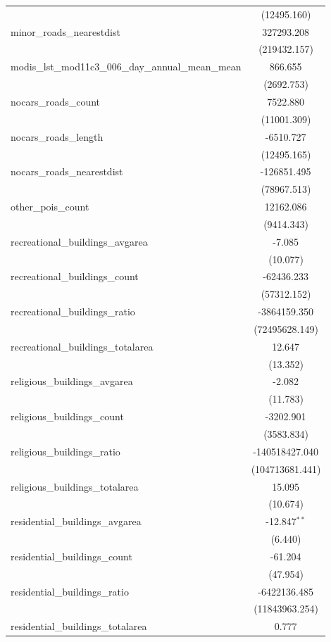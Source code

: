 \begin{table}[!htbp]
\begin{tabular}{@{\extracolsep{5pt}}lc}
  & (12495.160) \\
 minor_roads_nearestdist & 327293.208$^{}$ \\
  & (219432.157) \\
 modis_lst_mod11c3_006_day_annual_mean_mean & 866.655$^{}$ \\
  & (2692.753) \\
 nocars_roads_count & 7522.880$^{}$ \\
  & (11001.309) \\
 nocars_roads_length & -6510.727$^{}$ \\
  & (12495.165) \\
 nocars_roads_nearestdist & -126851.495$^{}$ \\
  & (78967.513) \\
 other_pois_count & 12162.086$^{}$ \\
  & (9414.343) \\
 recreational_buildings_avgarea & -7.085$^{}$ \\
  & (10.077) \\
 recreational_buildings_count & -62436.233$^{}$ \\
  & (57312.152) \\
 recreational_buildings_ratio & -3864159.350$^{}$ \\
  & (72495628.149) \\
 recreational_buildings_totalarea & 12.647$^{}$ \\
  & (13.352) \\
 religious_buildings_avgarea & -2.082$^{}$ \\
  & (11.783) \\
 religious_buildings_count & -3202.901$^{}$ \\
  & (3583.834) \\
 religious_buildings_ratio & -140518427.040$^{}$ \\
  & (104713681.441) \\
 religious_buildings_totalarea & 15.095$^{}$ \\
  & (10.674) \\
 residential_buildings_avgarea & -12.847$^{**}$ \\
  & (6.440) \\
 residential_buildings_count & -61.204$^{}$ \\
  & (47.954) \\
 residential_buildings_ratio & -6422136.485$^{}$ \\
  & (11843963.254) \\
 residential_buildings_totalarea & 0.777$^{}$ \\

\end{tabular}
\end{table}
